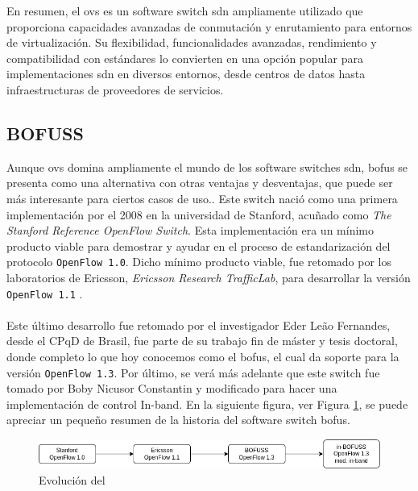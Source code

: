 En resumen, el \gls{ovs} es un software switch \gls{sdn} ampliamente utilizado que proporciona capacidades avanzadas de conmutación y enrutamiento para entornos de virtualización. Su flexibilidad, funcionalidades avanzadas, rendimiento y compatibilidad con estándares lo convierten en una opción popular para implementaciones \gls{sdn} en diversos entornos, desde centros de datos hasta infraestructuras de proveedores de servicios.


\subsection{BOFUSS}
\label{subsec:BOFUSS}

Aunque \gls{ovs} domina ampliamente el mundo de los software switches \gls{sdn}, \gls{bofus} se presenta como una alternativa con otras ventajas y desventajas, que puede ser más interesante para ciertos casos de uso.. Este switch nació como una primera implementación por el 2008 en la universidad de Stanford, acuñado como  \textit{The Stanford Reference OpenFlow Switch}. Esta implementación era un mínimo producto viable para demostrar y ayudar en el proceso de estandarización del protocolo \texttt{OpenFlow 1.0}. Dicho mínimo producto viable, fue retomado por los laboratorios de Ericsson, \textit{Ericsson Research TrafficLab}, para desarrollar la versión \texttt{OpenFlow 1.1} \cite{fernandes2020road}. \\
\\
Este último desarrollo fue retomado por el investigador Eder Leão Fernandes, desde el CPqD de Brasil, fue parte de su trabajo fin de máster y tesis doctoral, donde completo lo que hoy conocemos como el \gls{bofus}, el cual da soporte para la versión \texttt{OpenFlow 1.3}. Por último, se verá más adelante que este switch fue tomado por Boby Nicusor Constantin y modificado para hacer una implementación de control In-band. En la siguiente figura, ver Figura \ref{fig:bofuss1}, se puede apreciar un pequeño resumen de la historia del software switch \gls{bofus}.

\begin{figure}[ht]
    \centering
    \includegraphics[width=\textwidth]{archivos/img/teoria/bofuss1.png}
    \caption{Evolución del }
    \label{fig:bofuss1}
\end{figure}

